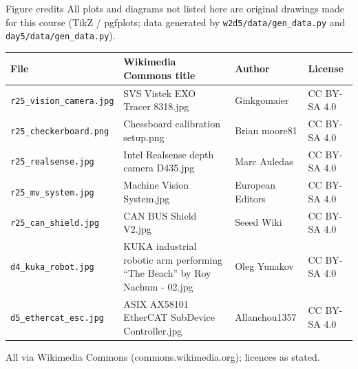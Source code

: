 \documentclass[aspectratio=169,10pt]{beamer}
\begin{document}
\begin{frame}{Figure credits}
\scriptsize
All plots and diagrams not listed here are original drawings made for this course (TikZ / pgfplots; data generated by \texttt{w2d5/data/gen\_data.py} and \texttt{day5/data/gen\_data.py}).

\vspace{2mm}
\renewcommand{\arraystretch}{1.15}
\begin{tabularx}{\linewidth}{@{}l X l l@{}}
\toprule
\textbf{File} & \textbf{Wikimedia Commons title} & \textbf{Author} & \textbf{License}\\
\midrule
\texttt{r25\_vision\_camera.jpg} & SVS Vistek EXO Tracer 8318.jpg & Ginkgomaier & CC BY-SA 4.0\\
\texttt{r25\_checkerboard.png} & Chessboard calibration setup.png & Brian moore81 & CC BY-SA 4.0\\
\texttt{r25\_realsense.jpg} & Intel Realsense depth camera D435.jpg & Marc Auledas & CC BY-SA 4.0\\
\texttt{r25\_mv\_system.jpg} & Machine Vision System.jpg & European Editors & CC BY-SA 4.0\\
\texttt{r25\_can\_shield.jpg} & CAN BUS Shield V2.jpg & Seeed Wiki & CC BY-SA 4.0\\
\texttt{d4\_kuka\_robot.jpg} & KUKA industrial robotic arm performing ``The Beach'' by Roy Nachum - 02.jpg & Oleg Yunakov & CC BY-SA 4.0\\
\texttt{d5\_ethercat\_esc.jpg} & ASIX AX58101 EtherCAT SubDevice Controller.jpg & Allanchou1357 & CC BY-SA 4.0\\
\bottomrule
\end{tabularx}

\vspace{1mm}
All via Wikimedia Commons (commons.wikimedia.org); licences as stated.
\end{frame}
\end{document}
